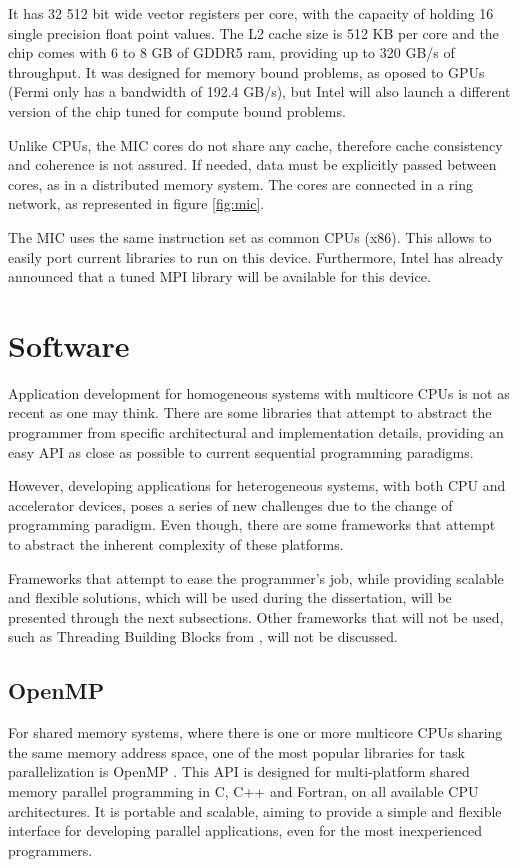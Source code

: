 It has 32 512 bit wide vector registers per core, with the capacity of holding 16 single precision float point values. The L2 cache size is 512 KB per core and the chip comes with 6 to 8 GB of GDDR5 ram, providing up to 320 GB/s of throughput. It was designed for memory bound problems, as oposed to GPUs (Fermi only has a bandwidth of 192.4 GB/s), but Intel will also launch a different version of the chip tuned for compute bound problems.

Unlike CPUs, the MIC cores do not share any cache, therefore cache consistency and coherence is not assured. If needed, data must be explicitly passed between cores, as in a distributed memory system. The cores are connected in a ring network, as represented in figure \ref{fig:mic}.

The MIC uses the same instruction set as common \intel CPUs (x86). This allows to easily port current libraries to run on this device. Furthermore, Intel has already announced that a tuned MPI library will be available for this device.

\section{Software}

Application development for homogeneous systems with multicore CPUs is not as recent as one may think. There are some libraries that attempt to abstract the programmer from specific architectural and implementation details, providing an easy API as close as possible to current sequential programming paradigms.

However, developing applications for heterogeneous systems, with both CPU and accelerator devices, poses a series of new challenges due to the change of programming paradigm. Even though, there are some frameworks that attempt to abstract the inherent complexity of these platforms.

Frameworks that attempt to ease the programmer’s job, while providing scalable and flexible solutions, which will be used during the dissertation, will be presented through the next subsections. Other frameworks that will not be used, such as Threading Building Blocks from \intel \cite{Intel:TBB}, will not be discussed.

\subsection{OpenMP}

For shared memory systems, where there is one or more multicore CPUs sharing the same memory address space, one of the most popular libraries for task parallelization is OpenMP \cite{OpenMP}. This API is designed for multi-platform shared memory parallel programming in C, C++ and Fortran, on all available CPU architectures. It is portable and scalable, aiming to provide a simple and flexible interface for developing parallel applications, even for the most inexperienced programmers.

